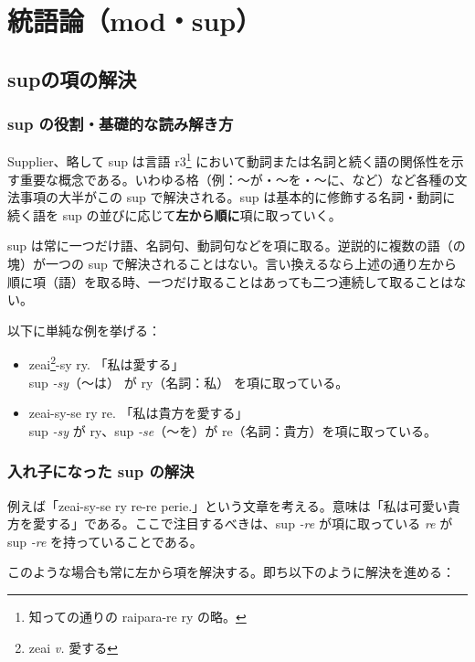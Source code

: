 \section{統語論（mod・sup）}

\subsection{supの項の解決}

\subsubsection{sup の役割・基礎的な読み解き方}

Supplier、略して sup は言語 r3\footnote{知っての通りの raipara-re ry の略。} において動詞または名詞と続く語の関係性を示す重要な概念である。いわゆる格（例：～が・～を・～に、など）など各種の文法事項の大半がこの sup で解決される。sup は基本的に修飾する名詞・動詞に続く語を sup の並びに応じて\textbf{左から順に}項に取っていく。

sup は常に一つだけ語、名詞句、動詞句などを項に取る。逆説的に複数の語（の塊）が一つの sup で解決されることはない。言い換えるなら上述の通り左から順に項（語）を取る時、一つだけ取ることはあっても二つ連続して取ることはない。

以下に単純な例を挙げる：

\begin{itemize}
    \item zeai\footnote{zeai \emph{v.} 愛する}-sy ry. 「私は愛する」\\ sup \emph{-sy}（～は） が ry（名詞：私） を項に取っている。
    \item zeai-sy-se ry re. 「私は貴方を愛する」\\ sup \emph{-sy} が ry、sup \emph{-se}（～を）が re（名詞：貴方）を項に取っている。
\end{itemize}

\subsubsection{入れ子になった sup の解決}

例えば「zeai-sy-se ry re-re perie.」という文章を考える。意味は「私は可愛い貴方を愛する」である。ここで注目するべきは、sup \emph{-re} が項に取っている \emph{re} が sup \emph{-re} を持っていることである。

このような場合も常に左から項を解決する。即ち以下のように解決を進める：

